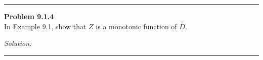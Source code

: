 \documentclass[a4paper, 11pt]{article}
\newenvironment{problem}[2][Problem]
    { \begin{mdframed}[backgroundcolor=gray!20] \textbf{#1 #2} \\}
    {  \end{mdframed}}
\newenvironment{solution}
    {\textit{Solution:}}
    {}
\begin{document}
\noindent\rule{7in}{2.8pt}

\begin{problem}{9.1.4}
	In Example 9.1, show that $Z$ is a monotonic function of $\bar{D}$.
\end{problem}
\begin{solution}
\end{solution} 

\noindent\rule{7in}{2.8pt}

\end{document}
